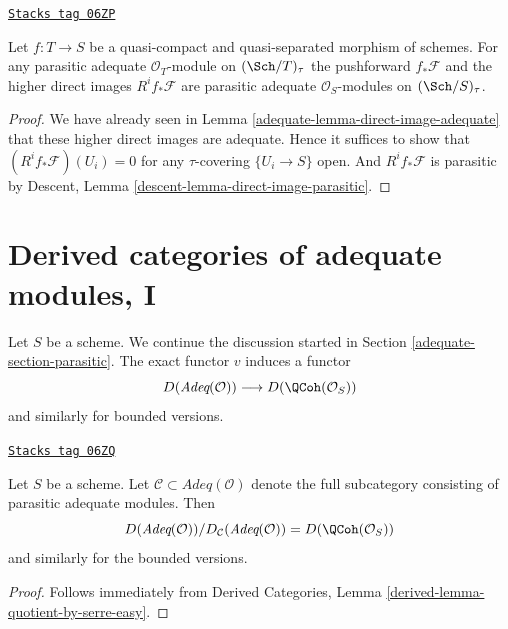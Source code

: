 \begin{lemma}
\label{adequate-lemma-direct-image-parasitic-adequate}
\href{https://stacks.math.columbia.edu/tag/06ZP}{\texttt{Stacks tag 06ZP}}

Let $f : T \to S$ be a quasi-compact and quasi-separated morphism
of schemes. For any parasitic adequate $\mathcal{O}_T$-module on
$(\Sch/T)_\tau$ the pushforward
$f_*\mathcal{F}$ and the higher direct images $R^if_*\mathcal{F}$
are parasitic adequate $\mathcal{O}_S$-modules on $(\Sch/S)_\tau$.
\end{lemma}

\begin{proof}

We have already seen in
Lemma \ref{adequate-lemma-direct-image-adequate}
that these higher direct images are adequate.
Hence it suffices to show that
$(R^if_*\mathcal{F})(U_i) = 0$ for any $\tau$-covering
$\{U_i \to S\}$ open. And $R^if_*\mathcal{F}$
is parasitic by
Descent, Lemma \ref{descent-lemma-direct-image-parasitic}.
\end{proof}

\section{Derived categories of adequate modules, I}
\label{adequate-section-comparison}
Let $S$ be a scheme. We continue the discussion started in
Section \ref{adequate-section-parasitic}.
The exact functor $v$ induces a functor
$$
D(\textit{Adeq}(\mathcal{O}))
\longrightarrow
D(\QCoh(\mathcal{O}_S))
$$
and similarly for bounded versions.

\begin{lemma}
\label{adequate-lemma-quotient-easy}
\href{https://stacks.math.columbia.edu/tag/06ZQ}{\texttt{Stacks tag 06ZQ}}

Let $S$ be a scheme. Let
$\mathcal{C} \subset \textit{Adeq}(\mathcal{O})$ denote the
full subcategory consisting of parasitic adequate modules.
Then
$$
D(\textit{Adeq}(\mathcal{O}))/D_\mathcal{C}(\textit{Adeq}(\mathcal{O}))
= D(\QCoh(\mathcal{O}_S))
$$
and similarly for the bounded versions.
\end{lemma}

\begin{proof}
Follows immediately from
Derived Categories, Lemma \ref{derived-lemma-quotient-by-serre-easy}.
\end{proof}

